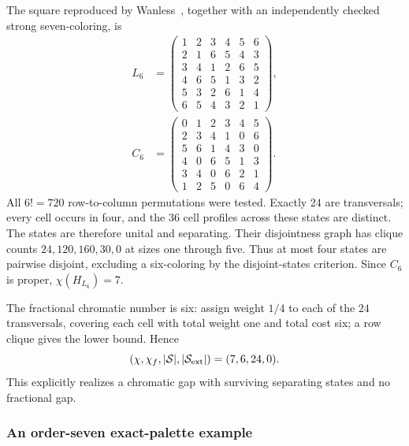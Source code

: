 \documentclass[aps,pra,reprint,superscriptaddress,longbibliography,nofootinbib,floatfix,10pt]{revtex4-2}
\theoremstyle{definition}\newtheorem{definition}[theorem]{Definition}
\theoremstyle{remark}\newtheorem{remark}[theorem]{Remark}
\newcommand{\Sc}{\mathcal S}\newcommand{\Cc}{\mathcal C}
\begin{document}
The square reproduced by Wanless~\cite{wanless2002plex}, together with an independently checked strong seven-coloring, is
\begin{equation}\label{eq:finney-six}
\begin{aligned}
L_6&=\begin{pmatrix}1&2&3&4&5&6\\2&1&6&5&4&3\\3&4&1&2&6&5\\4&6&5&1&3&2\\5&3&2&6&1&4\\6&5&4&3&2&1\end{pmatrix},\\
C_6&=\begin{pmatrix}0&1&2&3&4&5\\2&3&4&1&0&6\\5&6&1&4&3&0\\4&0&6&5&1&3\\3&4&0&6&2&1\\1&2&5&0&6&4\end{pmatrix}.
\end{aligned}
\end{equation}
All $6!=720$ row-to-column permutations were tested. Exactly $24$ are transversals; every cell occurs in four, and the $36$ cell profiles across these states are distinct. The states are therefore unital and separating. Their disjointness graph has clique counts $24,120,160,30,0$ at sizes one through five. Thus at most four states are pairwise disjoint, excluding a six-coloring by the disjoint-states criterion. Since $C_6$ is proper, $\chi(H_{L_6})=7$.

The fractional chromatic number is six: assign weight $1/4$ to each of the $24$ transversals, covering each cell with total weight one and total cost six; a row clique gives the lower bound. Hence
\[
(\chi,\chi_f,|\Sc|,|\Sc_{\rm ext}|)=(7,6,24,0).
\]
This explicitly realizes a chromatic gap with surviving separating states and no fractional gap.

\subsubsection{An order-seven exact-palette example}
\end{document}
